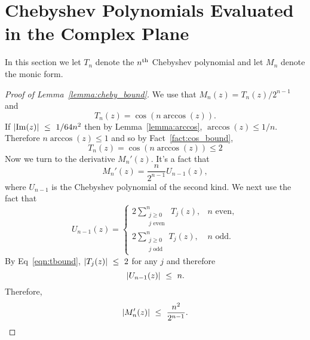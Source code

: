 \section{Chebyshev Polynomials Evaluated in the Complex Plane}
\label{appendix:chebyshev}
In this section we let $T_n$ denote the ${n}^{\textrm{th}}$ Chebyshev polynomial and let $M_n$ denote the monic form. 

\begin{proof}[Proof of Lemma~\ref{lemma:cheby_bound}]
We use that $M_n(z) = T_n(z)/2^{n-1}$ and
\begin{equation}
T_n(z) =  \cos \left( n \arccos(z)\right).
\end{equation}
If $|\mathrm{Im}(z)| ~\le~ 1/64n^2$ then by Lemma~\ref{lemma:arccos}, $\arccos(z) \leq 1/n$. Therefore $n \arccos(z) \leq 1$ and so by Fact~\ref{fact:cos_bound}, 
\begin{equation}
\label{eqn:tbound}
    T_n(z) = \cos( n \arccos(z)) \leq 2
\end{equation}
Now we turn to the derivative $M_n'(z)$. It's a fact that
\begin{equation}
    M_n'(z) = \frac{n}{2^{n-1}} U_{n-1}(z),
\end{equation}
where $U_{n-1}$ is the Chebyshev polynomial of the second kind. We next use the fact that
\begin{equation*}
    U_{n-1}(z) = \begin{cases} 2 \sum_{\substack{j \geq 0 \\ j \textrm{ even } }}^n T_j(z), & n \textrm{ even}, \\
    2 \sum_{\substack{j \geq 0 \\ j \textrm{ odd } }}^n T_j(z), & n \textrm{ odd} .
    \end{cases}
\end{equation*}
By Eq~\eqref{eqn:tbound}, $|T_j(z)| ~\le~ 2$ for any $j$ and therefore
\begin{equation}
    |U_{n-1}(z)| ~\le~ n.
\end{equation}
Therefore, 
\begin{equation*}
    |M_n'(z)| ~\le~ \frac{n^2}{2^{n-1}}.
\end{equation*}
\end{proof}


